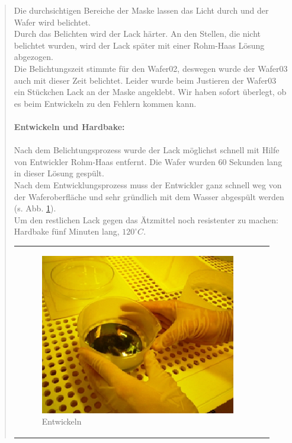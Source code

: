 \begin{quote}
    		Die durchsichtigen Bereiche der Maske lassen das Licht durch und der
    		Wafer wird belichtet.\\
			Durch das Belichten wird der Lack härter. An den Stellen, die nicht
			belichtet wurden, wird der Lack später mit einer Rohm-Haas Lösung
			abgezogen.\\
			Die Belichtungszeit stimmte für den Wafer02, deswegen wurde der
			Wafer03 auch mit dieser Zeit belichtet. Leider wurde beim Justieren
			der Wafer03 ein Stückchen Lack an der Maske angeklebt. Wir haben 
			sofort überlegt, ob es beim Entwickeln zu den Fehlern kommen kann.\\
			\\
			\textbf{Entwickeln und Hardbake:}\\
			\\
			Nach dem Belichtungsprozess wurde der Lack möglichst schnell mit
			Hilfe von Entwickler Rohm-Haas entfernt. Die Wafer wurden 60
			Sekunden lang in dieser Lösung gespült.\\
			Nach dem Entwicklungsprozess muss der Entwickler ganz schnell weg
			von der Waferoberfläche und sehr gründlich mit dem Wasser abgespült
			werden (s. Abb. \ref{fig:entw}).\\
			Um den restlichen Lack gegen das Ätzmittel noch resistenter zu machen:
			Hardbake fünf Minuten lang, $120^{\circ}C$.

			\vspace{2em}

    		\begin{center}
                \begin{tabular}{ll}

                \hspace{-14em}
                    \begin{minipage}{0.7\textwidth}
                        \begin{figure}[H]
                        \hspace{4em}
                            \includegraphics[scale=1.0, trim = 0cm 0cm 0cm
                            0cm, clip]{./HerstellungBilder/Entwickeln.png}
                            \caption{Entwickeln}
                           \label{fig:entw}
                        \end{figure}


\end{minipage}
\end{tabular}
\end{center}
\end{quote}
